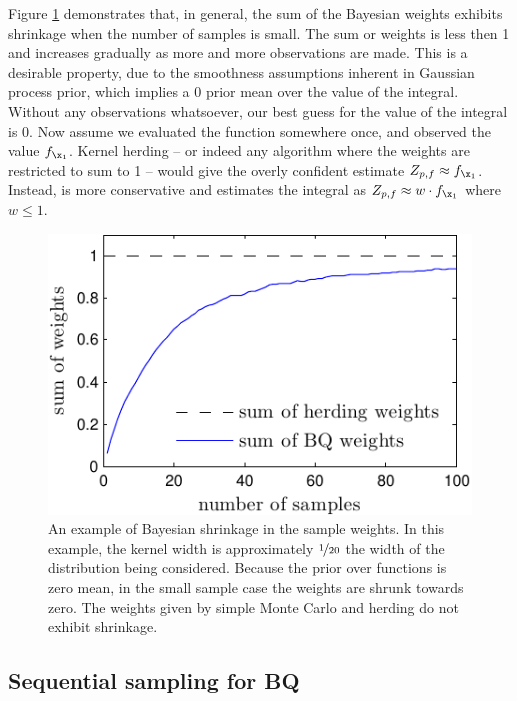 Figure \ref{fig:weights_shrinkage} demonstrates that, in general, the sum of the Bayesian weights exhibits shrinkage when the number of samples is small. The sum or weights is less then 1 and increases gradually as more and more observations are made. This is a desirable property, due to the smoothness assumptions inherent in Gaussian process prior, which implies a $0$ prior mean over the value of the integral. Without any observations whatsoever, our best guess for the value of the integral is $0$. Now assume we evaluated the function somewhere once, and observed the value $f_{\x_1}$. Kernel herding -- or indeed any algorithm where the weights are restricted to sum to 1 -- would give the overly confident estimate $Z_{p,f} \approx f_{\x_1}$. Instead, \bq{} is more conservative and estimates the integral as $Z_{p,f} \approx w\cdot f_{\x_1}$ where $w \leq 1$.

\begin{figure}
	\centering
	\includegraphics[width=.8\columnwidth]{figs/herding/weights_shrinkage}
	
		\caption[The concept of shrinkage in Bayesian quadrature]{An example of Bayesian shrinkage in the sample weights. In this example, the kernel width is approximately $\nicefrac{1}{20}$ the width of the distribution being considered. Because the prior over functions is zero mean, in the small sample case the weights are shrunk towards zero. The weights given by simple Monte Carlo and herding do not exhibit shrinkage. }
	\label{fig:weights_shrinkage}
\end{figure}

\subsection{Sequential sampling for BQ}

